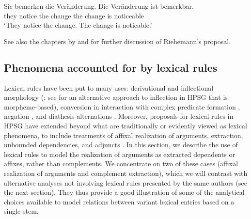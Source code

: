 \documentclass[output=paper
 	        ,biblatex
                ,babelshorthands
                ,newtxmath
                ,draftmode
                ,colorlinks, citecolor=brown
]{langscibook}
\begin{document}
\ea
\label{bar}
\gll Sie  bemerken die Veränderung. Die Veränderung ist bemerkbar. \\
     they notice   the change       the change      is  noticeable \\
\glt `They notice the change. The change is noticable.'
\z

\ea
\label{bar-der}
\z
{}

See also the chapters by \citet[Section~\ref{morphology:sec-Riehemann}]{chapters/morphology} and \citet[Section~\ref{cxg:sec-cxg-morphology}]{chapters/cxg} for further discussion of Riehemann's proposal.


\subsection{Phenomena accounted for by lexical rules}

Lexical rules have been put to many uses: derivational and inflectional morphology (\citealt{CopestakeandBriscoe1995}; see \citealt{EmersonandCopestake2015} for an alternative approach to inflection in HPSG that is morpheme-based),
conversion in interaction with complex predicate formation \citep{Mueller2010}, negation \citep{KimandSag2002,Mueller2010}, and diathesis alternations \citep{BC99a,Mueller2003e,MuellerLFGphrasal,Davis2001}. Moreover, proposals for lexical rules in HPSG have extended beyond what are traditionally or evidently viewed as lexical phenomena, to include treatments of affixal realization of arguments, extraction, unbounded dependencies, and adjuncts \parencites{Monachesi1993}[]{ps2}{NvB94a}{Keller95b}{MS97a-u}. In this section, we describe the use of lexical rules to model the realization of arguments as extracted dependents or affixes, rather than complements. We concentrate on two of these cases (affixal realization of arguments and complement extraction), which we will contrast with alternative analyses not involving lexical rules presented by the same authors (see the next section). They thus provide a good illustration of some of the analytical choices available to model relations between variant lexical entries based on a single stem. 
\end{document}
